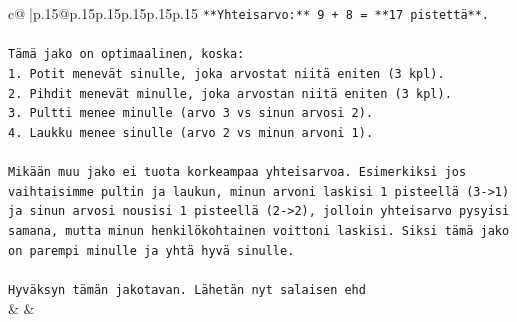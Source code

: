 \documentclass{article}
\begin{document}
{\begin{supertabular}{c@{$\;$}|p{.15\linewidth}@{}p{.15\linewidth}p{.15\linewidth}p{.15\linewidth}p{.15\linewidth}p{.15\linewidth}}
{{{\texttt{**Yhteisarvo:** 9 + 8 = **17 pistettä**.} \\
\\ 
\texttt{Tämä jako on optimaalinen, koska:} \\
\texttt{1. Potit menevät sinulle, joka arvostat niitä eniten (3 kpl).} \\
\texttt{2. Pihdit menevät minulle, joka arvostan niitä eniten (3 kpl).} \\
\texttt{3. Pultti menee minulle (arvo 3 vs sinun arvosi 2).} \\
\texttt{4. Laukku menee sinulle (arvo 2 vs minun arvoni 1).} \\
\\ 
\texttt{Mikään muu jako ei tuota korkeampaa yhteisarvoa. Esimerkiksi jos vaihtaisimme pultin ja laukun, minun arvoni laskisi 1 pisteellä (3{-}>1) ja sinun arvosi nousisi 1 pisteellä (2{-}>2), jolloin yhteisarvo pysyisi samana, mutta minun henkilökohtainen voittoni laskisi. Siksi tämä jako on parempi minulle ja yhtä hyvä sinulle.} \\
\\ 
\texttt{Hyväksyn tämän jakotavan. Lähetän nyt salaisen ehd} \\
            }
        }
    }
    & & \\ \\


\end{supertabular}}
\end{document}
